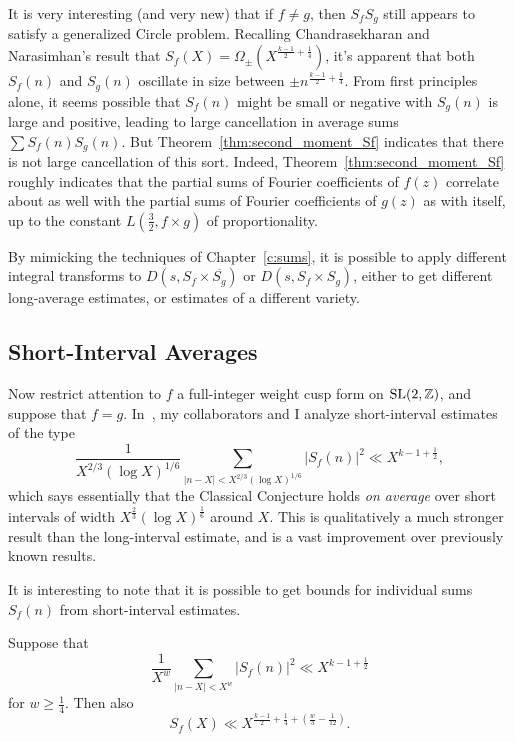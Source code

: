 It is very interesting (and very new) that if $f \neq g$, then $S_f S_g$ still appears to
satisfy a generalized Circle problem.
Recalling Chandrasekharan and Narasimhan's result that $S_f(X) =
\Omega_{\pm}(X^{\frac{k-1}{2} + \frac{1}{4}})$, it's apparent that both $S_f(n)$ and
$S_g(n)$ oscillate in size between $\pm n^{\frac{k-1}{2} + \frac{1}{4}}$.
From first principles alone, it seems possible that $S_f(n)$ might be small or negative
with $S_g(n)$ is large and positive, leading to large cancellation in average sums $\sum
S_f(n) S_g(n)$.
But Theorem~\ref{thm:second_moment_Sf} indicates that there is not large cancellation of
this sort.
Indeed, Theorem~\ref{thm:second_moment_Sf} roughly indicates that the partial sums of
Fourier coefficients of $f(z)$ correlate about as well with the partial sums of Fourier
coefficients of $g(z)$ as with itself, up to the constant $L(\frac{3}{2}, f \times g)$ of
proportionality.


By mimicking the techniques of Chapter~\ref{c:sums}, it is possible to apply different
integral transforms to $D(s, S_f \times \overline{S_g})$ or $D(s, S_f \times S_g)$, either
to get different long-average estimates, or estimates of a different variety.



\subsection*{Short-Interval Averages}


Now restrict attention to $f$ a full-integer weight cusp form on $\operatorname{SL}(2, \mathbb{Z})$, and
suppose that $f = g$.
In~\cite{hkldwShort}, my collaborators and I analyze short-interval estimates of the type
\begin{equation}\label{eq:short-interval-estimate}
  \frac{1}{X^{2/3}(\log X)^{1/6}} \sum_{\lvert n-X \rvert < X^{2/3} (\log X)^{1/6}} \lvert
  S_f(n) \rvert^2 \ll X^{k-1 + \frac{1}{2}},
\end{equation}
which says essentially that the Classical Conjecture holds \emph{on average} over short
intervals of width $X^{\frac{2}{3}} (\log X)^{\frac{1}{6}}$ around $X$.
This is qualitatively a  much stronger result than the long-interval estimate, and is a
vast improvement over previously known results.


It is interesting to note that it is possible to get bounds for individual sums $S_f(n)$
from short-interval estimates.


\begin{proposition}
  Suppose that
  \begin{equation}
    \frac{1}{X^w} \sum_{\lvert n - X \rvert < X^w} \lvert S_f(n) \rvert^2 \ll X^{k - 1 +
    \frac{1}{2}}
  \end{equation}
  for $w \geq \frac{1}{4}$.
  Then also
  \begin{equation}
    S_f(X) \ll X^{\frac{k-1}{2} + \frac{1}{4} + (\frac{w}{3} - \frac{1}{12})}.
  \end{equation}
\end{proposition}


